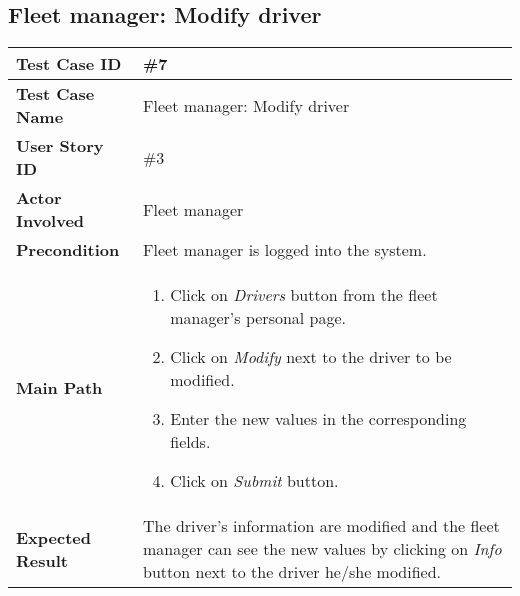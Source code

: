 \subsection{Fleet manager: Modify driver}
\begin{center}
	\begin{tabular} { | m{3.5cm} | m{9.5cm} | }
		\hline
		\textbf{Test Case ID} & \#7\\
		\hline
		\textbf{Test Case Name} & Fleet manager: Modify driver\\
		\hline
		\textbf{User Story ID} & \#3 \\
		\hline
		\textbf{Actor Involved} & Fleet manager\\
		\hline
		\textbf{Precondition} & Fleet manager is logged into the system.\\
		\hline
		\textbf{Main Path} & 
		\begin{enumerate}
			\item Click on \textit{Drivers} button from the fleet manager's personal page.
			\item Click on \textit{Modify} next to the driver to be modified.
			\item Enter the new values in the corresponding fields.
			\item Click on \textit{Submit} button.
		\end{enumerate}\\
		\hline
		\textbf{Expected Result} & The driver's information are modified and the fleet manager can see the new values by clicking on \textit{Info} button next to the driver he/she modified.\\
		\hline
	\end{tabular}
\end{center}
\newpage
